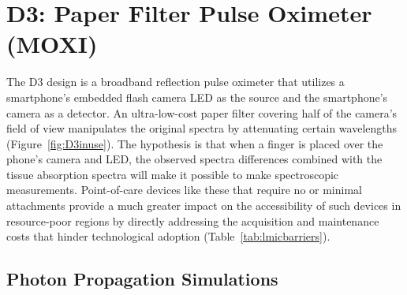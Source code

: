 \section{D3: Paper Filter Pulse Oximeter (MOXI)}
The D3 design is a broadband reflection pulse oximeter that utilizes a smartphone's embedded flash camera LED as the source and the smartphone's camera as a detector. An ultra-low-cost paper filter covering half of the camera's field of view manipulates the original spectra by attenuating certain wavelengths (Figure~\ref{fig:D3inuse}). The hypothesis is that when a finger is placed over the phone's camera and LED, the observed spectra differences combined with the tissue absorption spectra will make it possible to make spectroscopic measurements. Point-of-care devices like these that require no or minimal attachments provide a much greater impact on the accessibility of such devices in resource-poor regions by directly addressing the acquisition and maintenance costs that hinder technological adoption (Table~\ref{tab:lmicbarriers}).

\subsection{Photon Propagation Simulations}
